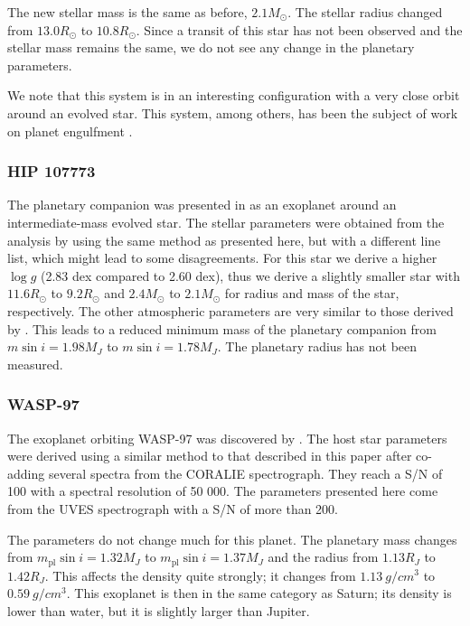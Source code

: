 \documentclass{aa}
\begin{document}
The new stellar mass is the same as before, $2.1M_\odot$. The stellar radius
changed from $13.0R_\odot$ to $10.8R_\odot$. Since a transit of this star has
not been observed and the stellar mass remains the same, we do not see any
change in the planetary parameters.

We note that this system is in an interesting configuration with a very close
orbit around an evolved star. This system, among others, has been the subject of
work on planet engulfment \citep[see e.g.][]{Kunitomo2011}.


\subsubsection{HIP 107773}
\label{sub:HIP_107773}
The planetary companion was presented in \citet{Jones2015} as an exoplanet
around an intermediate-mass evolved star. The stellar parameters were obtained
from the analysis by \citet{Jones2011} using the same method as presented here,
but with a different line list, which might lead to some disagreements. For this
star we derive a higher $\log g$ (2.83 dex compared to 2.60 dex), thus we derive
a slightly smaller star with $11.6R_\odot$ to $9.2R_\odot$ and $2.4M_\odot$ to
$2.1M_\odot$ for radius and mass of the star, respectively. The other
atmospheric parameters are very similar to those derived by \citet{Jones2011}.
This leads to a reduced minimum mass of the planetary companion from $m\sin
i=1.98M_J$ to $m\sin i=1.78M_J$. The planetary radius has not been measured.



\subsubsection{WASP-97}
\label{sub:WASP-97}
The exoplanet orbiting WASP-97 was discovered by \citet{Hellier2014}. The host
star parameters were derived using a similar method to that described in this
paper after co-adding several spectra from the CORALIE spectrograph. They reach
a S/N of 100 with a spectral resolution of 50 000. The parameters presented here
come from the UVES spectrograph with a S/N of more than 200.

The parameters do not change much for this planet. The planetary mass changes
from $m_\mathrm{pl}\sin i=1.32M_J$ to $m_\mathrm{pl}\sin i=1.37M_J$ and the
radius from $1.13R_J$ to $1.42R_J$. This affects the density quite strongly; it
changes from $\SI{1.13}{g/cm^3}$ to $\SI{0.59}{g/cm^3}$. This exoplanet is then
in the same category as Saturn; its density is lower than water, but it is
slightly larger than Jupiter.
\end{document}
